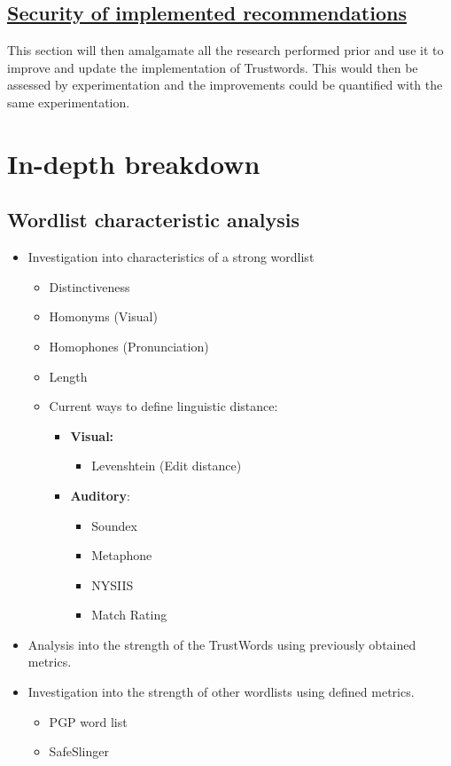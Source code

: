 \subsection*{\hyperref[ref:rec]{Security of implemented recommendations}}
This section will then amalgamate all the research performed prior and use it to improve and update the implementation of Trustwords. This would then be assessed by experimentation and the improvements could be quantified with the same experimentation.

\section{In-depth breakdown}

\subsection{Wordlist characteristic analysis}
\label{ref:wordlist}
\begin{itemize}
    \item Investigation into characteristics of a strong wordlist
    \begin{itemize}
        \item Distinctiveness
        \item Homonyms (Visual)
        \item Homophones (Pronunciation)
        \item Length
        \item Current ways to define linguistic distance:
        \begin{itemize}
            \item \textbf{Visual:}
            \begin{itemize}
                \item Levenshtein (Edit distance)
            \end{itemize}

            \item \textbf{Auditory}:
            \begin{itemize}
                \item Soundex
                \item Metaphone
                \item NYSIIS
                \item Match Rating
            \end{itemize}
        \end{itemize}
        
    \end{itemize}


    \item Analysis into the strength of the TrustWords using previously obtained metrics.

    \item Investigation into the strength of other wordlists using defined metrics.
    \begin{itemize}
        \item PGP word list
        \item SafeSlinger
    \end{itemize}

\end{itemize}

